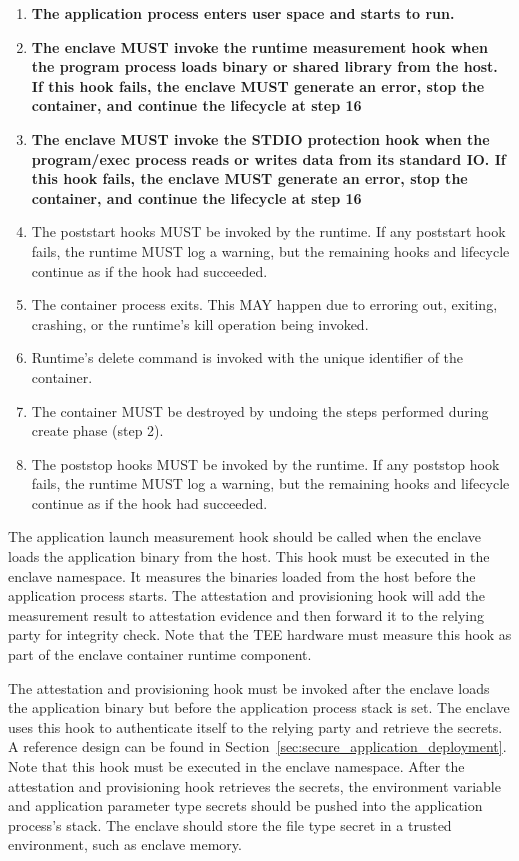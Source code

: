 \begin{enumerate}
    \item \textbf{The application process enters user space and starts to run.}
    \item \textbf{The enclave MUST invoke the runtime measurement hook when the program process loads binary or shared library from the host. If this hook fails, the enclave MUST generate an error, stop the container, and continue the lifecycle at step 16}
    \item \textbf{The enclave MUST invoke the STDIO protection hook when the program/exec process reads or writes data from its standard IO. If this hook fails, the enclave MUST generate an error, stop the container, and continue the lifecycle at step 16}
    \item The poststart hooks MUST be invoked by the runtime. If any poststart hook fails, the runtime MUST log a warning, but the remaining hooks and lifecycle continue as if the hook had succeeded.
    \item The container process exits. This MAY happen due to erroring out, exiting, crashing, or the runtime's kill operation being invoked.
    \item Runtime's delete command is invoked with the unique identifier of the container.
    \item The container MUST be destroyed by undoing the steps performed during create phase (step 2).
    \item The poststop hooks MUST be invoked by the runtime. If any poststop hook fails, the runtime MUST log a warning, but the remaining hooks and lifecycle continue as if the hook had succeeded.    
  \end{enumerate}

  

  The application launch measurement hook should be called when the enclave loads the application binary from the host. This hook must be executed in the enclave namespace. It measures the binaries loaded from the host before the application process starts. The attestation and provisioning hook will add the measurement result to attestation evidence and then 
  forward it to the relying party for integrity check. Note that the \acrshort{TEE} hardware must measure this hook as part of the enclave container runtime component.
 
  The attestation and provisioning hook must be invoked after the enclave loads the application binary but before the application process stack is set. The enclave uses this hook to authenticate itself to the relying party and retrieve the secrets. A reference design can be found in Section~\ref{sec:secure_application_deployment}. Note that this hook must be 
  executed in the enclave namespace. After the attestation and provisioning hook retrieves the secrets, the environment variable and application parameter type secrets should be pushed into the application process's stack. The enclave should store the file type secret in a trusted environment, such as enclave memory. 
   

